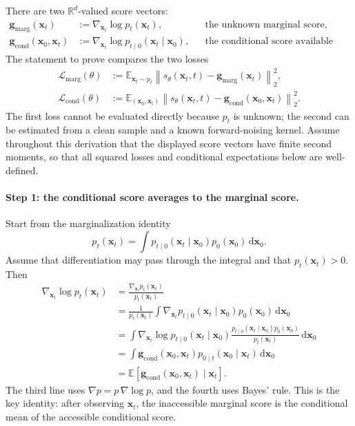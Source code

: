 \documentclass[11pt,a4paper]{article}
\theoremstyle{definition}
\begin{document}
There are two $\mathbb{R}^d$-valued score vectors:
\[
\begin{aligned}
\mathbf{g}_{\mathrm{marg}}(\mathbf{x}_t)
&:=\nabla_{\mathbf{x}_t}\log p_t(\mathbf{x}_t),
&&\text{the unknown marginal score,}\\
\mathbf{g}_{\mathrm{cond}}(\mathbf{x}_0,\mathbf{x}_t)
&:=\nabla_{\mathbf{x}_t}\log
p_{t\mid 0}(\mathbf{x}_t\mid\mathbf{x}_0),
&&\text{the conditional score available from the forward kernel.}
\end{aligned}
\]
The statement to prove compares the two losses
\[
\begin{aligned}
\mathcal{L}_{\mathrm{marg}}(\theta)
&:=\mathbb{E}_{\mathbf{x}_t\sim p_t}
\left\|
s_\theta(\mathbf{x}_t,t)-\mathbf{g}_{\mathrm{marg}}(\mathbf{x}_t)
\right\|_2^2,\\
\mathcal{L}_{\mathrm{cond}}(\theta)
&:=\mathbb{E}_{(\mathbf{x}_0,\mathbf{x}_t)}
\left\|
s_\theta(\mathbf{x}_t,t)
-\mathbf{g}_{\mathrm{cond}}(\mathbf{x}_0,\mathbf{x}_t)
\right\|_2^2.
\end{aligned}
\]
The first loss cannot be evaluated directly because $p_t$ is unknown; the second can be
estimated from a clean sample and a known forward-noising kernel.
Assume throughout this derivation that the displayed score vectors have finite second
moments, so that all squared losses and conditional expectations below are well-defined.

\paragraph{Step 1: the conditional score averages to the marginal score.}
Start from the marginalization identity
\[
p_t(\mathbf{x}_t)
=\int
p_{t\mid 0}(\mathbf{x}_t\mid\mathbf{x}_0)
p_0(\mathbf{x}_0)\,\mathrm{d}\mathbf{x}_0.
\]
Assume that differentiation may pass through the integral and that
$p_t(\mathbf{x}_t)>0$. Then
\[
\begin{aligned}
\nabla_{\mathbf{x}_t}\log p_t(\mathbf{x}_t)
&=
\frac{\nabla_{\mathbf{x}_t}p_t(\mathbf{x}_t)}
{p_t(\mathbf{x}_t)}\\
&=
\frac{1}{p_t(\mathbf{x}_t)}
\int
\nabla_{\mathbf{x}_t}
p_{t\mid 0}(\mathbf{x}_t\mid\mathbf{x}_0)
p_0(\mathbf{x}_0)\,\mathrm{d}\mathbf{x}_0\\
&=
\int
\nabla_{\mathbf{x}_t}
\log p_{t\mid 0}(\mathbf{x}_t\mid\mathbf{x}_0)
\frac{
p_{t\mid 0}(\mathbf{x}_t\mid\mathbf{x}_0)
p_0(\mathbf{x}_0)}
{p_t(\mathbf{x}_t)}
\,\mathrm{d}\mathbf{x}_0\\
&=
\int
\mathbf{g}_{\mathrm{cond}}(\mathbf{x}_0,\mathbf{x}_t)
p_{0\mid t}(\mathbf{x}_0\mid\mathbf{x}_t)
\,\mathrm{d}\mathbf{x}_0\\
&=
\mathbb{E}\!\left[
\mathbf{g}_{\mathrm{cond}}(\mathbf{x}_0,\mathbf{x}_t)
\mid\mathbf{x}_t
\right].
\end{aligned}
\]
The third line uses
$\nabla p=p\,\nabla\log p$, and the fourth uses Bayes' rule. This is the key
identity: after observing $\mathbf{x}_t$, the inaccessible marginal score is the
conditional mean of the accessible conditional score.
\end{document}
